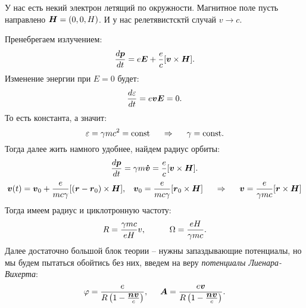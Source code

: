 
У нас есть некий электрон летящий по окружности. Магнитное поле пусть направлено  $\mbox{\boldmath $H$} = (0, 0, H)$. И у нас релетявистсктй случай $v \to c$.

Пренебрегаем излучением:
\begin{equation*}
    \frac{d \mbox{\boldmath $p$}}{d t} = e \mbox{\boldmath $E$} + \frac{e}{c}[\mbox{\boldmath $v$} \times \mbox{\boldmath $H$}].
\end{equation*}
Изменение энергии при $E = 0$ будет:
\begin{equation*}
    \frac{d \varepsilon}{d t} = e \mbox{\boldmath $v$} \mbox{\boldmath $E$} = 0.
\end{equation*}
То есть константа, а значит:
\begin{equation*}
    \varepsilon = \gamma mc^2 = \text{const}
    \hspace{0.5 cm}
    \Rightarrow
    \hspace{0.5 cm}
    \gamma = \text{const}.
\end{equation*}
Тогда далее жить намного удобнее, найдем радиус орбиты:
\begin{equation*}
    \frac{d \mbox{\boldmath $p$}}{d t} =  \gamma m \mbox{\boldmath $\dot{v}$} = \frac{e}{c} [\mbox{\boldmath $v$} \times \mbox{\boldmath $H$}].
\end{equation*}
\begin{equation*}
    \mbox{\boldmath $v$}(t) = \mbox{\boldmath $v$}_0 + \frac{e}{m c\gamma} [(\mbox{\boldmath $r$} - \mbox{\boldmath $r$}_0) \times \mbox{\boldmath $H$}],
    \hspace{0.3 cm}
    \mbox{\boldmath $v$}_0 =\frac{e}{m c\gamma} [\mbox{\boldmath $r$}_0 \times \mbox{\boldmath $H$}]
    \hspace{0.5 cm}
    \Rightarrow
    \hspace{0.5 cm}
    \mbox{\boldmath $v$} = \frac{e}{\gamma m c} [\mbox{\boldmath $r$} \times \mbox{\boldmath $H$}]
\end{equation*}
Тогда имеем радиус и циклотронную частоту:
\begin{equation*}
    R = \frac{\gamma mc}{e H}v,
    \hspace{1 cm}
    \Omega = \frac{e H}{\gamma mc}.
\end{equation*}
Далее достаточно большой блок теории -- нужны запаздывающие потенциалы, но мы будем пытаться обойтись без них, введем на веру \textit{потенциалы Лиенара-Вихерта}:
\begin{equation*}
    \varphi = \frac{e}{R \left(1 - \frac{\mbox{\boldmath $n$} \mbox{\boldmath $v$}}{c}\right)},
    \hspace{0.5 cm}
    \mbox{\boldmath $A$} = \frac{e \mbox{\boldmath $v$}}{R \left(1 - \frac{\mbox{\boldmath $n$} \mbox{\boldmath $v$}}{c}\right)}.
\end{equation*}

